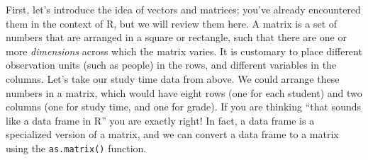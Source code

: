 \documentclass[12pt,]{book}
\newenvironment{Shaded}{\begin{snugshade}}{\end{snugshade}}
\newcommand{\DataTypeTok}[1]{\textcolor[rgb]{0.13,0.29,0.53}{#1}}
\newcommand{\DecValTok}[1]{\textcolor[rgb]{0.00,0.00,0.81}{#1}}
\newcommand{\KeywordTok}[1]{\textcolor[rgb]{0.13,0.29,0.53}{\textbf{#1}}}
\newcommand{\NormalTok}[1]{#1}
\newcommand{\OperatorTok}[1]{\textcolor[rgb]{0.81,0.36,0.00}{\textbf{#1}}}
\newcommand{\StringTok}[1]{\textcolor[rgb]{0.31,0.60,0.02}{#1}}
\theoremstyle{definition}
\theoremstyle{definition}
\theoremstyle{definition}
\theoremstyle{remark}
\begin{document}
First, let's introduce the idea of vectors and matrices; you've already encountered them in the context of R, but we will review them here. A matrix is a set of numbers that are arranged in a square or rectangle, such that there are one or more \emph{dimensions} across which the matrix varies. It is customary to place different observation units (such as people) in the rows, and different variables in the columns. Let's take our study time data from above. We could arrange these numbers in a matrix, which would have eight rows (one for each student) and two columns (one for study time, and one for grade). If you are thinking ``that sounds like a data frame in R'' you are exactly right! In fact, a data frame is a specialized version of a matrix, and we can convert a data frame to a matrix using the \texttt{as.matrix()} function.

\begin{Shaded}
\end{Shaded}
\end{document}
